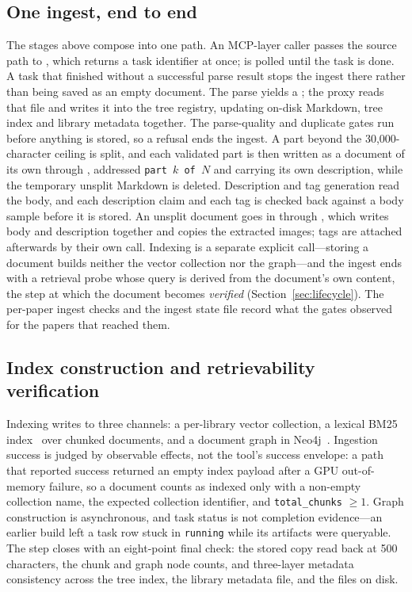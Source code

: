 \subsection{One ingest, end to end}
\label{sec:acq-trace}

The stages above compose into one path. An MCP-layer caller passes the
source path to , which returns a task identifier at once;
 is polled until the task is done. A task that
finished without a successful parse result stops the ingest there rather
than being saved as an empty document. The parse yields a
; the proxy reads that file and writes it into the
tree registry, updating on-disk Markdown, tree index and library metadata
together. The parse-quality and duplicate gates run before anything is
stored, so a refusal ends the ingest. A part beyond the
30{,}000-character ceiling is split, and each validated part is then written as
a document of its own through , addressed
\texttt{part $k$ of $N$} and carrying its own description, while the temporary
unsplit Markdown is deleted. Description and tag generation read the body, and
each description claim and each tag is checked back against a body sample
before it is stored. An unsplit document goes in through
, which writes body and description together and
copies the extracted images; tags are attached afterwards by their own call.
Indexing is a separate explicit call---storing a document builds neither the
vector collection nor the graph---and the ingest ends with a retrieval probe
whose query is derived from the document's own content, the step at which the
document becomes \emph{verified} (Section~\ref{sec:lifecycle}). The per-paper
ingest checks and the ingest state file record what the gates observed for the
papers that reached them.

\subsection{Index construction and retrievability verification}

Indexing writes to three channels: a per-library vector collection, a
lexical BM25 index~\citep{bm25} over chunked documents, and a document
graph in Neo4j~\citep{neo4j}. Ingestion success is judged by observable
effects, not the tool's success envelope: a path that reported success
returned an empty index payload after a GPU out-of-memory failure,
so a document counts as indexed only with a non-empty collection name,
the expected collection identifier, and \texttt{total\_chunks} $\geq 1$.
Graph construction is asynchronous, and task status is not completion
evidence---an earlier build left a task row
stuck in \texttt{running} while its artifacts were queryable. The step
closes with an eight-point final check: the stored copy read back at 500
characters, the chunk and graph node counts, and three-layer metadata
consistency across the tree index, the library metadata file, and the
files on disk.

